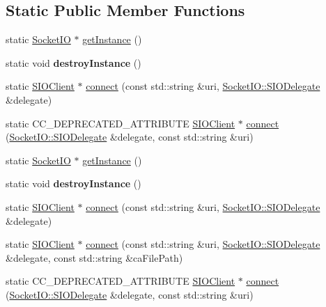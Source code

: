 \subsection*{Static Public Member Functions}
\begin{DoxyCompactItemize}
\item 
static \hyperlink{classnetwork_1_1SocketIO}{Socket\+IO} $\ast$ \hyperlink{classnetwork_1_1SocketIO_ad8607185ae7acb4a05f9b720bc699b6d}{get\+Instance} ()
\item 
\mbox{\label{classnetwork_1_1SocketIO_a971ba913c43bd740f2616f8b4a20024b}} 
static void {\bfseries destroy\+Instance} ()
\item 
static \hyperlink{classnetwork_1_1SIOClient}{S\+I\+O\+Client} $\ast$ \hyperlink{classnetwork_1_1SocketIO_a4a42c0b65a953f0ded8050df6a0854a7}{connect} (const std\+::string \&uri, \hyperlink{classnetwork_1_1SocketIO_1_1SIODelegate}{Socket\+I\+O\+::\+S\+I\+O\+Delegate} \&delegate)
\item 
static C\+C\+\_\+\+D\+E\+P\+R\+E\+C\+A\+T\+E\+D\+\_\+\+A\+T\+T\+R\+I\+B\+U\+TE \hyperlink{classnetwork_1_1SIOClient}{S\+I\+O\+Client} $\ast$ \hyperlink{classnetwork_1_1SocketIO_ae6f711ee78a961c1e98f3f2b752f5b83}{connect} (\hyperlink{classnetwork_1_1SocketIO_1_1SIODelegate}{Socket\+I\+O\+::\+S\+I\+O\+Delegate} \&delegate, const std\+::string \&uri)
\item 
static \hyperlink{classnetwork_1_1SocketIO}{Socket\+IO} $\ast$ \hyperlink{classnetwork_1_1SocketIO_a071858ead473c48e1a7b094f4e1f3102}{get\+Instance} ()
\item 
\mbox{\label{classnetwork_1_1SocketIO_a48b55e860d394bce755c19bbd40ed2f8}} 
static void {\bfseries destroy\+Instance} ()
\item 
static \hyperlink{classnetwork_1_1SIOClient}{S\+I\+O\+Client} $\ast$ \hyperlink{classnetwork_1_1SocketIO_aefd7c202b26b80f1cf1ecb446851977b}{connect} (const std\+::string \&uri, \hyperlink{classnetwork_1_1SocketIO_1_1SIODelegate}{Socket\+I\+O\+::\+S\+I\+O\+Delegate} \&delegate)
\item 
static \hyperlink{classnetwork_1_1SIOClient}{S\+I\+O\+Client} $\ast$ \hyperlink{classnetwork_1_1SocketIO_a5e9c8c1da93fc55017a5d41e52a8dd0b}{connect} (const std\+::string \&uri, \hyperlink{classnetwork_1_1SocketIO_1_1SIODelegate}{Socket\+I\+O\+::\+S\+I\+O\+Delegate} \&delegate, const std\+::string \&ca\+File\+Path)
\item 
static C\+C\+\_\+\+D\+E\+P\+R\+E\+C\+A\+T\+E\+D\+\_\+\+A\+T\+T\+R\+I\+B\+U\+TE \hyperlink{classnetwork_1_1SIOClient}{S\+I\+O\+Client} $\ast$ \hyperlink{classnetwork_1_1SocketIO_ae65e4a1bb17cab39bab3ece28f268f19}{connect} (\hyperlink{classnetwork_1_1SocketIO_1_1SIODelegate}{Socket\+I\+O\+::\+S\+I\+O\+Delegate} \&delegate, const std\+::string \&uri)
\end{DoxyCompactItemize}
